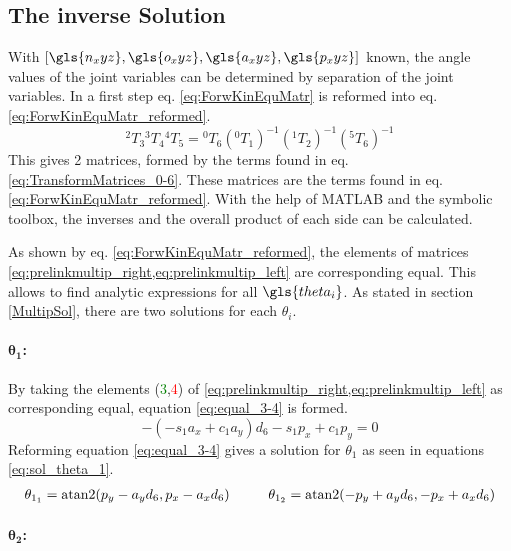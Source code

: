 \subsection{The inverse Solution} \label{InverseSol}
With $[\gls{n_xyz},\gls{o_xyz},\gls{a_xyz},\gls{p_xyz}]$ known, the angle values of the joint variables can be determined by separation of the joint variables. 
In a first step eq. \ref{eq:ForwKinEquMatr} is reformed into eq. \ref{eq:ForwKinEquMatr_reformed}.
\begin{equation}\label{eq:ForwKinEquMatr_reformed}
	\phantom{}^2T_3\phantom{}^3T_4\phantom{}^4T_5 = \phantom{}^0T_6(\phantom{}^0T_1)^{-1}(\phantom{}^1T_2)^{-1}(\phantom{}^5T_6)^{-1}
\end{equation}
This gives 2 matrices, formed by the terms found in eq. \ref{eq:TransformMatrices_0-6}. These matrices are the terms found in eq. \ref{eq:ForwKinEquMatr_reformed}.
With the help of MATLAB and the symbolic toolbox, the inverses and the overall product of each side can be calculated. %

	


As shown by eq. \ref{eq:ForwKinEquMatr_reformed}, the elements of matrices \cref{eq:prelinkmultip_right,eq:prelinkmultip_left} are corresponding equal. This allows to find analytic expressions for all $\gls{theta_i}$. As stated in section \ref{MultipSol}, there are two solutions for each $\theta_i$.
\medskip


\paragraph{$\pmb{\theta_1}$:}

By taking the elements (\textcolor{green}{3},\textcolor{red}{4}) of \cref{eq:prelinkmultip_right,eq:prelinkmultip_left} as corresponding equal, equation \ref{eq:equal_3-4} is formed.
\begin{equation}\label{eq:equal_3-4}
	-(-s_1a_x + c_1 a_y )d_6 - s_1 p_x +c_1 p_y = 0
\end{equation}
Reforming equation \ref{eq:equal_3-4} gives a solution for $\theta_1$ as seen in equations \ref{eq:sol_theta_1}.
\begin{multline}\label{eq:sol_theta_1}
	\theta_{1_1} = \operatorname{atan2} ( p_y - a_y d_6 , p_x - a_x d_6) 
	\phantom{..........}
	\theta_{1_2} = \operatorname{atan2} (-p_y + a_y d_6 ,-p_x + a_x d_6) 
\end{multline}
\medskip

\paragraph{$\pmb{\theta_2}$:}

